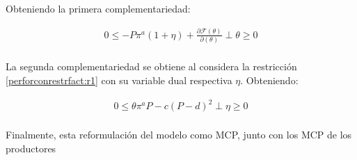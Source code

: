 Obteniendo la primera complementariedad:

\begin{equation}
\begin{array}{rrclcl}
    0\leq -P\pi^a(1+\eta)+\frac{\partial\mathcal{F}(\theta)}{\partial(\theta)} \perp \theta \geq 0 \label{compllag3}\\
\end{array}
\end{equation}

La segunda complementariedad se obtiene al considera la restricción \ref{perforconrestrfact:r1} con su variable dual respectiva $\eta$. Obteniendo:

\begin{equation}
\begin{array}{rrclcl}
    0 \leq \theta \pi^a P - c(P-d)^2 \perp \eta \geq 0 \label{compllag3}\\
\end{array}
\end{equation}

Finalmente, esta reformulación del modelo como MCP, junto con los MCP de los productores

